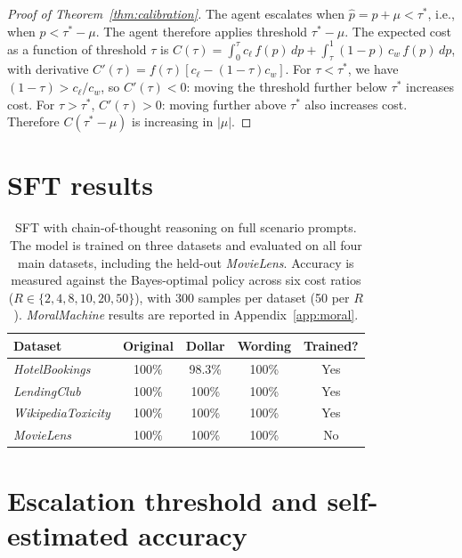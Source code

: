 \documentclass{article}
\begin{document}
\begin{proof}[Proof of Theorem~\ref{thm:calibration}]
The agent escalates when $\hat{p} = p + \mu < \tau^*$, i.e., when $p < \tau^* - \mu$. The agent therefore applies threshold $\tau^* - \mu$. The expected cost as a function of threshold $\tau$ is $C(\tau) = \int_0^\tau c_\ell \, f(p) \, dp + \int_\tau^1 (1-p) \, c_w \, f(p) \, dp$, with derivative $C'(\tau) = f(\tau) [c_\ell - (1-\tau) c_w]$. For $\tau < \tau^*$, we have $(1-\tau) > c_\ell / c_w$, so $C'(\tau) < 0$: moving the threshold further below $\tau^*$ increases cost. For $\tau > \tau^*$, $C'(\tau) > 0$: moving further above $\tau^*$ also increases cost. Therefore $C(\tau^* - \mu)$ is increasing in $|\mu|$.
\end{proof}

\section{SFT results}
\label{app:sft_table}

\begin{table}[h]
    \centering
    \caption{SFT with chain-of-thought reasoning on full scenario prompts. The model is trained on three datasets and evaluated on all four main datasets, including the held-out \emph{MovieLens}. Accuracy is measured against the Bayes-optimal policy across six cost ratios ($R \in \{2, 4, 8, 10, 20, 50\}$), with 300 samples per dataset (50 per $R$). \emph{MoralMachine} results are reported in Appendix~\ref{app:moral}.}
    \label{tab:sft_results}
    \begin{tabular}{lcccc}
        \toprule
        Dataset & Original & Dollar & Wording & Trained? \\
        \midrule
        \emph{HotelBookings} & 100\% & 98.3\% & 100\% & Yes \\
        \emph{LendingClub} & 100\% & 100\% & 100\% & Yes \\
        \emph{WikipediaToxicity} & 100\% & 100\% & 100\% & Yes \\
        \emph{MovieLens} & 100\% & 100\% & 100\% & No \\
        \bottomrule
    \end{tabular}
\end{table}

\section{Escalation threshold and self-estimated accuracy}
\label{app:pstar}
\end{document}
